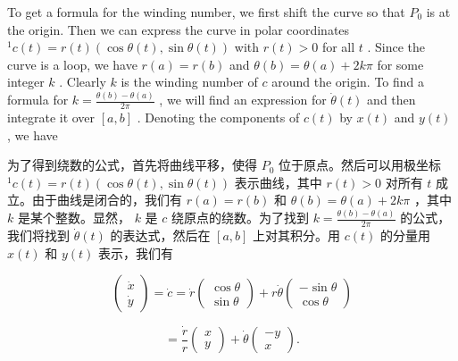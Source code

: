 To get a formula for the winding number, we first shift the curve so that \({P}_{0}\) is at the origin. Then we can express the curve in polar coordinates \({}^{1}c\left( t\right)  = r\left( t\right) \left( {\cos \theta \left( t\right) ,\sin \theta \left( t\right) }\right)\) with \(r\left( t\right)  > 0\) for all \(t\) . Since the curve is a loop, we have \(r\left( a\right)  = r\left( b\right)\) and \(\theta \left( b\right)  = \theta \left( a\right)  + {2k\pi }\) for some integer \(k\) . Clearly \(k\) is the winding number of \(c\) around the origin. To find a formula for \(k = \frac{\theta \left( b\right)  - \theta \left( a\right) }{2\pi }\) , we will find an expression for \(\dot{\theta }\left( t\right)\) and then integrate it over \(\left\lbrack  {a,b}\right\rbrack\) . Denoting the components of \(c\left( t\right)\) by \(x\left( t\right)\) and \(y\left( t\right)\) , we have

\begin{tcolorbox}
为了得到绕数的公式，首先将曲线平移，使得 \({P}_{0}\) 位于原点。然后可以用极坐标 \({}^{1}c\left( t\right)  = r\left( t\right) \left( {\cos \theta \left( t\right) ,\sin \theta \left( t\right) }\right)\) 表示曲线，其中 \(r\left( t\right)  > 0\) 对所有 \(t\) 成立。由于曲线是闭合的，我们有 \(r\left( a\right)  = r\left( b\right)\) 和 \(\theta \left( b\right)  = \theta \left( a\right)  + {2k\pi }\) ，其中 \(k\) 是某个整数。显然， \(k\) 是 \(c\) 绕原点的绕数。为了找到 \(k = \frac{\theta \left( b\right)  - \theta \left( a\right) }{2\pi }\) 的公式，我们将找到 \(\dot{\theta }\left( t\right)\) 的表达式，然后在 \(\left\lbrack  {a,b}\right\rbrack\) 上对其积分。用 \(c\left( t\right)\) 的分量用 \(x\left( t\right)\) 和 \(y\left( t\right)\) 表示，我们有
\end{tcolorbox}

\[
\left( \begin{array}{l} \dot{x} \\  \dot{y} \end{array}\right)  = \dot{c} = \dot{r}\left( \begin{matrix} \cos \theta \\  \sin \theta  \end{matrix}\right)  + r\dot{\theta }\left( \begin{matrix}  - \sin \theta \\  \cos \theta  \end{matrix}\right)  \tag{3.2}
\]

\[
= \frac{\dot{r}}{r}\left( \begin{array}{l} x \\  y \end{array}\right)  + \dot{\theta }\left( \begin{matrix}  - y \\  x \end{matrix}\right) .
\]

